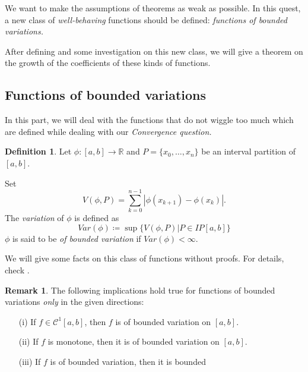 \documentclass[12pt]{amsart}
\theoremstyle{definition}
\newtheorem{definition}[theorem]{Definition}
\newtheorem{remark}[theorem]{Remark}
\newcommand{\RR}{{\mathbb R}} %
\newcommand{\cC}{{\mathcal C}}
\begin{document}
We want to make the assumptions of theorems as weak as possible. In this quest, a new class of \emph{well-behaving} functions should be defined: \emph{functions of bounded variations.} 


After defining and some investigation on this new class, we will give a theorem on the growth of the coefficients of these kinds of functions.


\subsection{Functions of bounded variations}


In this part, we will deal with the functions that do not wiggle too much\footnotemark{} which are defined while dealing with our \emph{Convergence question.}




\begin{definition}
    Let $\phi : [a,b] \to \RR$ and $P = \{x_0, \dots, x_n\}$ be an interval partition of $[a,b]$.

Set
\[
V(\phi,P) = \sum_{k=0}^{n-1}|\phi(x_{k+1}) - \phi(x_{k})|.
\]
The \emph{variation} of $\phi$ is defined as
\begin{equation}
    Var(\phi) \coloneqq \sup\{V(\phi,P)| P \in IP[a,b]\}
\end{equation}
$\phi$ is said to be \emph{of bounded variation} if $Var(\phi) < \infty$. \footnotemark{}
\end{definition}


We will give some facts on this class of functions without proofs. For details, check \cite{Wade}.


\begin{remark} \label{bounded var. implications}The following implications hold true for functions of bounded variations \emph{only} in the given directions:
    \begin{itemize}
        \item[(i)] If  $f \in \cC^1[a,b]$, then $f$ is of bounded variation on $[a, b]$.
        \item[(ii)] If  $f$ is monotone, then it is of bounded variation on $[a, b]$.
        \item[(iii)] If $f$ is of bounded variation, then it is bounded
    \end{itemize}
\end{remark}
\end{document}
